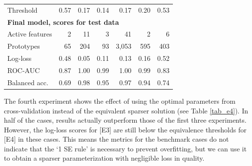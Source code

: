 \begin{table}
\begin{center}
\begin{tabular}{|lrrrrrr|}
Threshold&0.57&0.17&0.14&0.17&0.20&0.53\\
\multicolumn{7}{|l|}{\textbf{Final model, scores for test data}}\\
Active features&2&11&3&41&2&6\\
Prototypes&65&204&93&3,053&595&403\\
Log-loss&0.48&0.05&0.11&0.13&0.16&0.52\\
ROC-AUC&0.87&1.00&0.99&1.00&0.99&0.83\\
Balanced acc.&0.69&0.98&0.95&0.97&0.94&0.74\\
\hline
\end{tabular}
\end{center}
\end{table}
%
The fourth experiment shows the effect of using the optimal parameters from cross-validation instead of the equivalent sparser solution (see Table \ref{tab_e4}).
In half of the cases, results actually outperform those of the first three experiments.
However, the log-loss scores for [E3] are still below the equivalence thresholds for [E4] in these cases.
This means the metrics for the benchmark cases do not indicate that the `1 SE rule' is necessary to prevent overfitting, but we can use it to obtain a sparser parameterization with negligible loss in quality.
%
\clearpage
%
